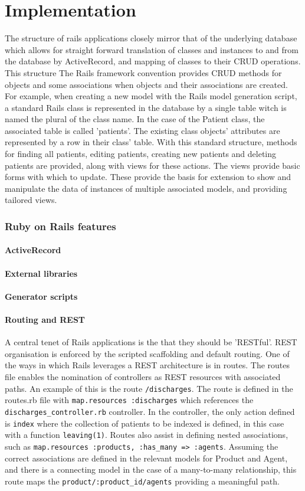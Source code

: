 \documentclass[letterpaper]{amsart}
\begin{document}
\part{Implementation}
The structure of rails applications closely mirror that of the underlying database which allows for straight forward translation of classes and instances to and from the database by ActiveRecord, and mapping of classes to their CRUD operations.   This structure
The Rails framework convention provides CRUD methods for objects and some associations when objects and their associations are created.  For example, when creating a new model with the Rails model generation script, a standard Rails class is represented in the database by a single table witch is named the plural of the class name.  In the case of the Patient class, the associated table is called 'patients'.  The existing class objects' attributes are represented by a row in their class' table.  With this standard structure, methods for finding all patients, editing patients, creating new patients and deleting patients are provided, along with views for these actions.  The views provide basic forms with which to update.  These provide the basis for extension to show and manipulate the data of instances of multiple associated models, and providing tailored views. 
\section{Ruby on Rails features}
\subsection{ActiveRecord}
\subsection{External libraries}
\subsection{Generator scripts}
\subsection{Routing and REST}
A central tenet of Rails applications is the that they should be 'RESTful'.  REST organisation is enforced by the scripted scaffolding and default routing.
One of the ways in which Rails leverages a REST architecture is in routes.  The routes file enables the nomination of controllers as REST resources with associated paths.  An example of this is the route \texttt{/discharges}.  The route is defined in the routes.rb file with \texttt{map.resources :discharges} which references the \texttt{discharges\_controller.rb} controller.  In the controller, the only action defined is \texttt{index} where the collection of patients to be indexed is defined, in this case with a function \texttt{leaving(1)}.  Routes also assist in defining nested associations, such as \texttt{map.resources :products, :has\_many => :agents}.  Assuming the correct associations are defined in the relevant models for Product and Agent, and there is a connecting model in the case of a many-to-many relationship, this route maps the \texttt{product/:product\_id/agents} providing a meaningful path.
  
\end{document}
